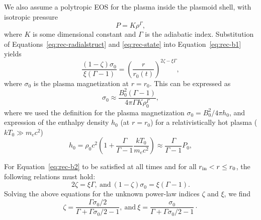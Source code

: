 We also assume a polytropic EOS for the plasma inside the plasmoid shell, with isotropic pressure
\begin{equation}
    \label{eq:rec-state}
    P = K\rho^\Gamma,
\end{equation}
where $K$ is some dimensional constant and $\Gamma$ is the adiabatic index. Substitution of Equations~\eqref{eq:rec-radialstruct} and  \eqref{eq:rec-state} into Equation~\eqref{eq:rec-b1} yields
\begin{equation}
\label{eq:rec-b2}
    \frac{(1-\zeta)\sigma_0}{\xi(\Gamma-1)} = \left(\frac{r}{r_0(t)}\right)^{2\zeta-\xi\Gamma},
\end{equation}
where $\sigma_0$ is the plasma magnetization at $r=r_0$. This can be expressed as
\begin{equation}
    \label{eq:rec-sigma0}
    \sigma_0 \approx \frac{B_0^2(\Gamma-1)}{4\pi \Gamma K\rho_0^\Gamma},
\end{equation}
where we used the definition for the plasma magnetization $\sigma_0 = B_0^2/4\pi h_0$, and expression of the enthalpy density $h_0$ (at $r=r_0$) for a relativistically hot plasma ($kT_0 \gg m_e c^2$)
\begin{equation}
    h_0 = \rho_0 c^2\left(1 + \frac{\Gamma}{\Gamma-1} \frac{kT_0}{m_e c^2}\right) \approx \frac{\Gamma}{\Gamma-1} P_0,
\end{equation} 

For Equation~\eqref{eq:rec-b2} to be satisfied at all times and for all $r_{\rm in} <r\le r_0$, the following relations must hold:
\begin{equation}
    2\zeta=\xi\Gamma,~\text{and}~(1-\zeta)\sigma_0=\xi(\Gamma-1).
\end{equation}
Solving the above equations for the unknown power-law indices $\zeta$ and $\xi$, we find
\begin{equation}\label{eq:rec-powerlaws_app}
    \zeta=\frac{\Gamma\sigma_0/2}{\Gamma + \Gamma\sigma_0/2 - 1},~\text{and}~\xi = \frac{\sigma_0}{\Gamma + \Gamma\sigma_0/2 - 1} \cdot
\end{equation}

